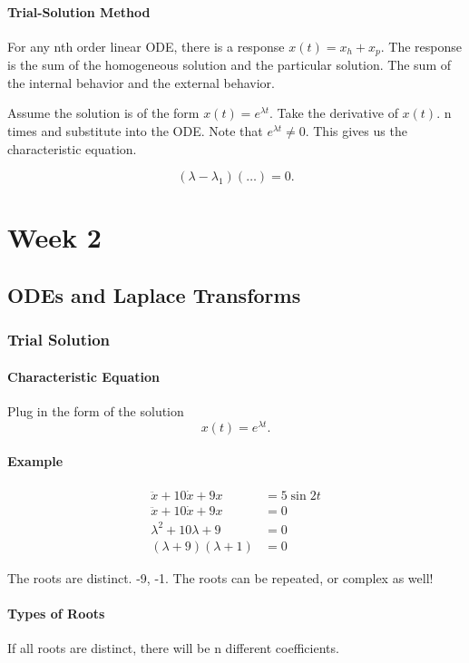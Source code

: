 \documentclass[12pt, a4paper]{report}
\begin{document}
    \subsection{Trial-Solution Method}

    For any nth order linear ODE, there is a response $ x(t) = x_h + x_p. $ The response is the sum of the homogeneous solution and the particular solution. The sum of the internal behavior and the external behavior.

    Assume the solution is of the form $ x(t) = e^{\lambda t}. $ Take the derivative of $ x(t). $ n times and substitute into the ODE. Note that $ e^{\lambda t} \neq 0. $ This gives us the characteristic equation.

    \[
        (\lambda - \lambda_1)( \ldots ) = 0
      .\]




  \part{Week 2}

  \chapter{ODEs and Laplace Transforms}

  \section{Trial Solution}

  \subsection{Characteristic Equation}
  Plug in the form of the solution
  \[
      x(t) = e^{\lambda t}
    .\]
  \subsection{Example}
  \begin{align}
    \ddot x + 10 \dot x + 9x &= 5 \sin 2t \\
    \ddot x + 10 \dot x + 9x &= 0 \\
    \lambda ^2 + 10 \lambda + 9 &= 0 \\
    (\lambda + 9)(\lambda + 1) &= 0
  \end{align}

  The roots are distinct. -9, -1. The roots can be repeated, or complex as well!

  \subsection{Types of Roots}
  If all roots are distinct, there will be n different coefficients.
\end{document}
